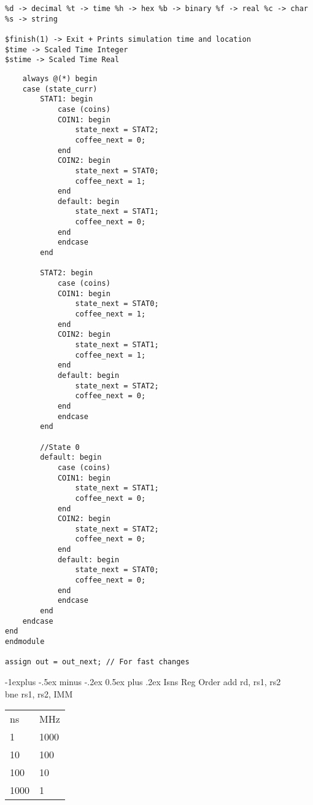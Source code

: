 \documentclass[12pt,landscape,a4paper]{article}
\makeatletter
\renewcommand{\subsection}{\@startsection{subsection}{2}{0mm}%
                                {-1explus -.5ex minus -.2ex}%
                                {0.5ex plus .2ex}%
                                {\normalfont\normalsize\bfseries}}
\makeatother
\begin{document}
\begin{multicols}{4}
\begin{tiny}
\begin{verbatim}
%d -> decimal %t -> time %h -> hex %b -> binary %f -> real %c -> char %s -> string

$finish(1) -> Exit + Prints simulation time and location 
$time -> Scaled Time Integer
$stime -> Scaled Time Real
\end{verbatim}
\end{tiny}
\columnbreak
\begin{tiny}
\begin{verbatim}
    always @(*) begin
    case (state_curr)    
        STAT1: begin
            case (coins)
            COIN1: begin
                state_next = STAT2;
                coffee_next = 0;
            end
            COIN2: begin 
                state_next = STAT0;
                coffee_next = 1;
            end
            default: begin 
                state_next = STAT1;
                coffee_next = 0;
            end
            endcase
        end
        
        STAT2: begin
            case (coins)
            COIN1: begin
                state_next = STAT0;
                coffee_next = 1;
            end
            COIN2: begin 
                state_next = STAT1;
                coffee_next = 1;
            end
            default: begin 
                state_next = STAT2;
                coffee_next = 0;
            end
            endcase
        end
        
        //State 0
        default: begin
            case (coins)
            COIN1: begin
                state_next = STAT1;
                coffee_next = 0;
            end
            COIN2: begin 
                state_next = STAT2;
                coffee_next = 0;
            end
            default: begin 
                state_next = STAT0;
                coffee_next = 0;
            end
            endcase
        end
    endcase
end  
endmodule

assign out = out_next; // For fast changes
\end{verbatim}
\end{tiny}
\columnbreak

\subsection{Isns Reg Order}
add rd, rs1, rs2\\
bne rs1, rs2, IMM

\begin{minipage}[t]{\linewidth}
\begin{tabular}{l | l }
    ns & MHz \\
    1 & 1000 \\
    10 & 100 \\
    100 & 10 \\
    1000 & 1 \\
\end{tabular}

\end{minipage}
\end{multicols}
\end{document}
